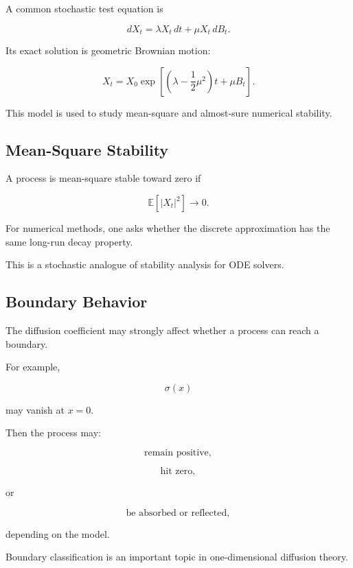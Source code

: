 A common stochastic test equation is

\[
\boxed{
dX_t
=
\lambda X_t\,dt
+
\mu X_t\,dB_t.
}
\]

Its exact solution is geometric Brownian motion:

\[
\boxed{
X_t
=
X_0
\exp
\left[
\left(
\lambda-\frac12\mu^2
\right)t
+
\mu B_t
\right].
}
\]

This model is used to study mean-square and almost-sure numerical
stability.

\subsection{Mean-Square Stability}
\label{subsec:mean-square-stability}

A process is mean-square stable toward zero if

\[
\boxed{
\mathbb{E}[|X_t|^2]
\to0.
}
\]

For numerical methods, one asks whether the discrete approximation has
the same long-run decay property.

This is a stochastic analogue of stability analysis for ODE solvers.

\subsection{Boundary Behavior}
\label{subsec:sde-boundary-behavior}

The diffusion coefficient may strongly affect whether a process can
reach a boundary.

For example,

\[
\sigma(x)
\]

may vanish at \(x=0\).

Then the process may:

\[
\text{remain positive},
\]

\[
\text{hit zero},
\]

or

\[
\text{be absorbed or reflected},
\]

depending on the model.

Boundary classification is an important topic in one-dimensional
diffusion theory.

